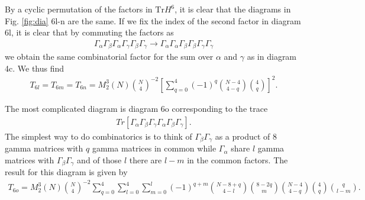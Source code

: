 \documentclass[aps,showpacs,floatfix,superscriptaddress,pre,11pt]{revtex4-1}
\newcommand{\Tr}{\rm Tr}
\newcommand{\nn}{\nonumber}
\newcommand{\be}{\begin{eqnarray}}
\newcommand{\ee}{\end{eqnarray}}
\def\Tr{\textrm{Tr}}
\begin{document}
              By a cyclic permutation of the factors in $\Tr H^6$, it
              is clear that the diagrams in Fig. \ref{fig:dia} 6l-n are
              the same.
              If we fix the index of the second factor in diagram 6l,
              it is clear that by commuting  the factors as
              \be
              \Gamma_\alpha \Gamma_\beta \Gamma_\alpha \Gamma_\gamma \Gamma_\beta \Gamma_\gamma
              \to  \Gamma_\alpha \Gamma_\alpha \Gamma_\beta  \Gamma_\beta\Gamma_\gamma \Gamma_\gamma
              \ee
              we obtain the same combinatorial factor for the sum over $\alpha$ and $\gamma$ as in diagram
              4c. We thus find
              \be
              T_{6l}=T_{6m}=T_{6n}=           
              M_2^3(N){N \choose 4}^{-2}
   \left [\sum_{q=0}^4(-1)^q
{N-4 \choose 4-q}{4\choose q}
\right ]^2.
   \ee

   The most complicated diagram is diagram 6o corresponding to the trace
   \be
   Tr[\Gamma_\alpha \Gamma_\beta \Gamma_\gamma \Gamma_\alpha \Gamma_\beta \Gamma_\gamma].
   \ee
   The simplest way to do combinatorics is to think of $\Gamma_\beta \Gamma_\gamma$ as a
   product of 8 gamma matrices with $q$ gamma matrices in common while $\Gamma_\alpha $ share
   $l$ gamma matrices with   $ \Gamma_\beta \Gamma_\gamma$ and of those $l$ there are $l-m$ in the
   common factors. The result for this diagram is given by
\be
T_{6o}=          
M_2^3(N)
{N\choose 4}^{-2}
\sum_{q=0}^4 \sum_{l=0}^{4}\sum_{m=0}^{l}(-1)^{q+m}
    {N-8+q\choose 4-l} {8-2q \choose m}{N-4 \choose 4-q}{4\choose q}{q\choose l-m}.\nn\\
\ee
    
\end{document}
